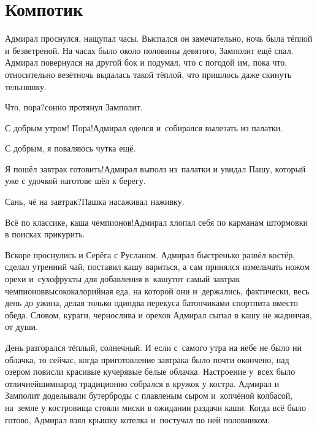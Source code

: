 \chapter{Компотик}
\vepsianrose

Адмирал проснулся, нащупал часы. Выспался он замечательно, ночь была тёплой и безветреной. На часах было около половины девятого, Замполит ещё спал. Адмирал повернулся на другой бок и подумал, что с погодой им, пока что, относительно везёт\mdash ночь выдалась такой тёплой, что пришлось даже скинуть тельняшку.

\diagdash Что, пора?\mdash сонно протянул Замполит.

\diagdash С добрым утром! Пора!\mdash Адмирал оделся и~собирался вылезать из палатки.

\diagdash С добрым, я поваляюсь чутка ещё.

\diagdash Я пошёл завтрак готовить!\mdash Адмирал выполз из~палатки и увидал Пашу, который уже с удочкой наготове шёл к берегу.

\diagdash Сань, чё на завтрак?\mdash Пашка насаживал наживку.

\diagdash Всё по классике, каша чемпионов!\mdash Адмирал хлопал себя по карманам штормовки в поисках прикурить.

Вскоре проснулись и Серёга с Русланом. Адмирал быстренько развёл костёр, сделал утренний чай, поставил кашу вариться, а сам принялся измельчать ножом орехи и~сухофрукты для добавления в~кашу\mdash тот самый завтрак чемпионов\mdash высококалорийная еда, на которой они и~держались, фактически, весь день до ужина, делая только один\sdash два перекуса батончиками спортпита вместо обеда. Словом, кураги, чернослива и орехов Адмирал сыпал в кашу не жадничая, от души.

День разгорался тёплый, солнечный. И если с~самого утра на небе не было ни облачка, то сейчас, когда приготовление завтрака было почти окончено, над озером повисли красивые кучерявые белые облачка. Настроение у~всех было отличнейшим\mdash народ традиционно собрался в кружок у костра. Адмирал и Замполит доделывали бутерброды с плавленым сыром и~копчёной колбасой, на~земле у костровища стояли миски в ожидании раздачи каши. Когда всё было готово, Адмирал взял крышку котелка и~постучал по ней половником:

